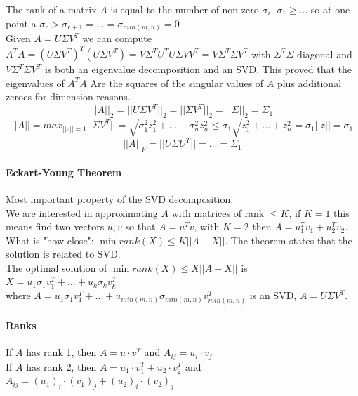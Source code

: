 \documentclass[10pt]{report}
\begin{document}
The rank of a matrix $A$ is equal to the number of non-zero $\sigma_i$. $\sigma_1\geq \ldots$ so at one point a $\sigma_r > \sigma_{r+1} = \ldots = \sigma_{min(m,n)} = 0$\\
Given $A = U\Sigma V^T$ we can compute $A^T A = (U\Sigma V^T)^T(U\Sigma V^T) = V\Sigma^T U^T U \Sigma VV^T = V\Sigma^T \Sigma V^T$ with $\Sigma^T \Sigma$ diagonal and $V\Sigma^T \Sigma V^T$ is both an eigenvalue decomposition and an SVD. This proved that the eigenvalues of $A^T A$ Are the squares of the singular values of $A$ plus additional zeroes for dimension reasons.
$$||A||_2 = ||U\Sigma V^T||_2 = ||\Sigma V^T||_2 = ||\Sigma||_2 = \Sigma_1$$
$$||A|| = max_{||z|| = 1} ||\Sigma V^T|| = \sqrt{\sigma_1^2 z_1^2 + \ldots + \sigma_n^2 z_n^2} \leq \sigma_1 \sqrt{z_1^2 +\ldots + z_n^2} = \sigma_1||z|| = \sigma_1$$
$$||A||_F = ||U\Sigma U^T|| = \ldots = \Sigma_1$$
\paragraph{Eckart-Young Theorem} Most important property of the SVD decomposition.\\
We are interested in approximating $A$ with matrices of rank $\leq K$, if $K = 1$ this means find two vectors $u, v$ so that $A = u^T v$, with $K=2$ then $A = u_1^T v_1 + u_2^T v_2$. What is "how close": $\min{rank(X) \leq K}||A - X||$. The theorem states that the solution is related to SVD.\\
The optimal solution of $\min{rank(X) \leq X}||A - X||$ is $X = u_1\sigma_1 v_1^T + \ldots + u_k\sigma_k v_k^T$\\where $A = u_1\sigma_1 v_1^T + \ldots + u_{min(m,n)}\sigma_{min(m,n)} v_{min(m,n)}^T$ is an SVD, $A = U\Sigma V^T$.
\paragraph{Ranks} If $A$ has rank 1, then $A = u\cdot v^T$ and $A_{ij} = u_i\cdot v_j$\\
If $A$ has rank 2, then $A= u_1\cdot v_1^T + u_2\cdot v_2^T$ and $A_{ij} = (u_1)_i\cdot (v_1)_j + (u_2)_i\cdot (v_2)_j$
\end{document}
